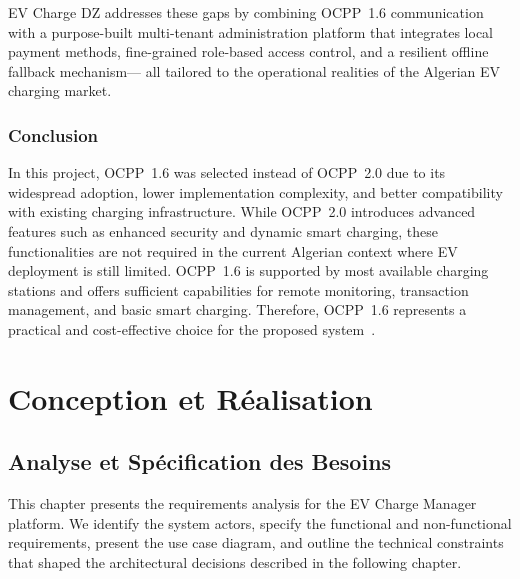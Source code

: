 \documentclass[12pt,a4paper]{report}
\begin{document}
EV Charge DZ addresses these gaps by combining OCPP~1.6 communication with a
purpose-built multi-tenant administration platform that integrates local payment methods,
fine-grained role-based access control, and a resilient offline fallback mechanism---
all tailored to the operational realities of the Algerian EV charging market.

\section{Conclusion}

In this project, OCPP~1.6 was selected instead of OCPP~2.0 due to its widespread adoption, lower
implementation complexity, and better compatibility with existing charging infrastructure. While
OCPP~2.0 introduces advanced features such as enhanced security and dynamic smart charging, these
functionalities are not required in the current Algerian context where EV deployment is still
limited. OCPP~1.6 is supported by most available charging stations and offers sufficient
capabilities for remote monitoring, transaction management, and basic smart charging. Therefore,
OCPP~1.6 represents a practical and cost-effective choice for the proposed system~\autocite{ocpp16_ed2}.

\clearpage


\part*{Conception et Réalisation}


\chapter{Analyse et Spécification des Besoins}

This chapter presents the requirements analysis for the EV Charge Manager platform. We identify
the system actors, specify the functional and non-functional requirements, present the use case
diagram, and outline the technical constraints that shaped the architectural decisions described
in the following chapter.
\end{document}
